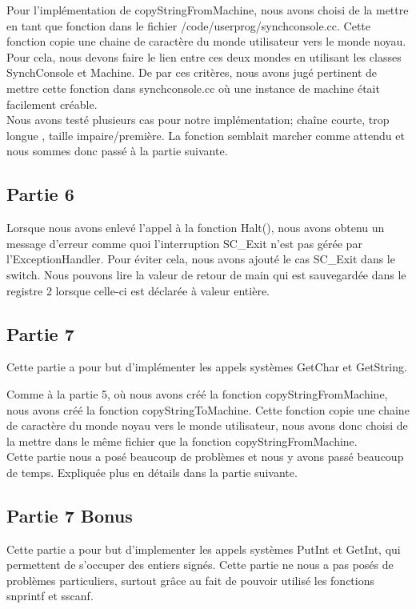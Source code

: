 \documentclass[a4paper]{article}
\begin{document}
Pour l'implémentation de copyStringFromMachine, nous avons choisi de la mettre
en tant que fonction dans le fichier /code/userprog/synchconsole.cc. Cette fonction
copie une chaine de caractère du monde utilisateur vers le monde noyau. Pour cela,
nous devons faire le lien entre ces deux mondes en utilisant les classes SynchConsole
et Machine. De par ces critères, nous avons jugé pertinent de mettre cette fonction
dans synchconsole.cc où une instance de machine était facilement créable. \\

Nous avons testé plusieurs cas pour notre implémentation; chaîne courte, trop longue
, taille impaire/première. La fonction semblait marcher comme attendu et nous sommes
donc passé à la partie suivante.

\subsection{Partie 6}
Lorsque nous avons enlevé l'appel à la fonction Halt(), nous avons obtenu
un message d'erreur comme quoi l'interruption SC\_Exit n'est pas gérée par
l'ExceptionHandler. Pour éviter cela, nous avons ajouté le cas SC\_Exit dans le
switch. Nous pouvons lire la valeur de retour de main qui est sauvegardée dans
le registre 2 lorsque celle-ci est déclarée à valeur entière.

\subsection{Partie 7}
Cette partie a pour but d'implémenter les appels systèmes GetChar et GetString.

Comme à la partie 5, où nous avons créé la fonction copyStringFromMachine, nous
avons créé la fonction copyStringToMachine. Cette fonction copie une chaine de
caractère du monde noyau vers le monde utilisateur, nous avons donc choisi de la
mettre dans le même fichier que la fonction copyStringFromMachine.\\

Cette partie nous a posé beaucoup de problèmes et nous y avons passé beaucoup de
temps. Expliquée plus en détails dans la partie suivante.

\subsection{Partie 7 Bonus}

Cette partie a pour but d'implementer les appels systèmes PutInt et GetInt, qui
permettent de s'occuper des entiers signés. Cette partie ne nous a pas posés de
problèmes particuliers, surtout grâce au fait de pouvoir utilisé les fonctions snprintf
et sscanf.
\end{document}
